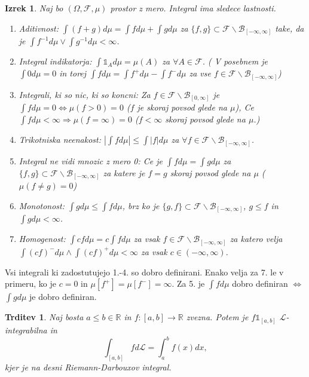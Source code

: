 \documentclass[a4paper,12pt]{article}
\theoremstyle{definition} %
\theoremstyle{plain} %
\newtheorem{izrek}[definicija]{Izrek}
\newtheorem{trditev}[definicija]{Trditev}
\newcommand{\R}{\mathbb{R}}
\newcommand{\F}{\mathcal{F}}
\begin{document}
            \begin{izrek}
                Naj bo $(\Omega, \F, \mu)$ prostor z mero. Integral ima sledece lastnosti.
                \begin{enumerate}
                    \item Aditivnost: $\int (f + g)d\mu = \int fd\mu + \int gd\mu$ za $\{f, g\} \subset \F\backslash\mathcal{B}_{[-\infty, \infty]}$ take, da je $\int f^{-1}d\mu \vee \int g^{-1}d\mu < \infty$.
                    \item Integral indikatorja: $\int \mathds{1}_Ad\mu = \mu(A)$ za $\forall A \in \F$. ( V posebnem je $\int 0 d\mu = 0$ in torej $\int fd\mu = \int f^{+}d\mu - \int f^{-}d\mu$ za vse $f \in \F\backslash\mathcal{B}_{[-\infty, \infty]}$)
                    \item Integrali, ki so nic, ki so koncni: Za $f \in \F\backslash\mathcal{B}_{[0, \infty]}$ je $\int f d\mu = 0 \iff \mu(f >0)= 0$ ($f$ je skoraj povsod glede na $\mu$), Ce $\int f d\mu < \infty \Rightarrow \mu(f = \infty) = 0$ ($f < \infty$ skoraj povsod glede na $\mu$.)
                    \item Trikotniska neenakost: $\left|\int fd\mu\right| \leq \int |f|d\mu$ za $\forall f \in \F\backslash\mathcal{B}_{[-\infty, \infty]}$.
                    \item Integral ne vidi mnozic z mero 0: Ce je $\int fd\mu = \int gd\mu$ za $\{f, g\} \subset \F\backslash\mathcal{B}_{[-\infty, \infty]}$ za katere je $f = g$ skoraj povsod glede na $\mu$ ($\mu(f \neq g) = 0$)
                    \item Monotonost: $\int gd\mu \leq \int fd\mu$, brz ko je $\{g, f\} \subset \F\backslash\mathcal{B}_{[-\infty, \infty]}$, $g\leq f$ in $\int gd\mu < \infty$.
                    \item Homogenost: $\int cfd\mu = c\int fd\mu$ za vsak $f \in \F\backslash\mathcal{B}_{[-\infty, \infty]}$ za katero velja $\int(cf)^-d\mu \wedge \int(cf)^+d\mu < \infty$ za vsak $c \in (-\infty, \infty)$.    
                    
                
                \end{enumerate}
            \end{izrek}

            Vsi integrali ki zadostutujejo 1.-4. so dobro definirani. Enako velja za 7. le v primeru, ko je $c = 0$ in $\mu[f^+] = \mu[f^-] = \infty$. Za 5. je $\int fd\mu$ dobro definiran $\iff$ $\int gd\mu$ je dobro definiran.

            \begin{trditev}
                Naj bosta $a \leq b \in \R$ in $f: [a, b] \rightarrow \R$ zvezna. Potem
                je $f\mathds{1}_{[a, b]}$ $\mathcal{L}$-integrabilna in 
                $$
                    \int_{[a, b]}fd\mathcal{L} = \int_a^bf(x)dx,
                $$
                kjer je na desni Riemann-Darbouxov integral.
            \end{trditev}
\end{document}
